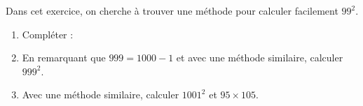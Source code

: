 \begin{exo}
	Dans cet exercice, on cherche à trouver une méthode pour calculer facilement $99^2$.

	\begin{enumerate}
		\item Compléter : 
		\item En remarquant que $999 = 1000 - 1$ et avec une méthode similaire, calculer $999^2$.
		\item Avec une méthode similaire, calculer $1001^2$ et $95 \times 105$.
	\end{enumerate}
\end{exo}
